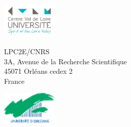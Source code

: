 {%
\includegraphics[width=0.2\textwidth, valign=c]{./images/pucvl}
\hfill
\begin{minipage}{.5\textwidth}
\begin{center}
LPC2E/CNRS\\
3A, Avenue de la Recherche Scientifique\\
45071 Orléans cedex 2\\
France \\
\end{center}
\end{minipage}
\hfill
\includegraphics[width=0.2\textwidth, valign=c]{./images/univ}

}